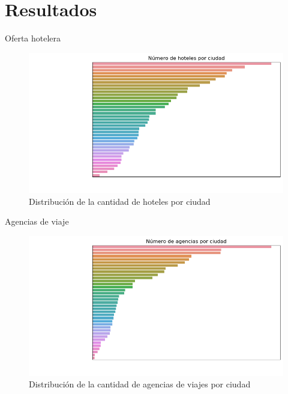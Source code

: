 \section{Resultados}

\begin{frame}{Oferta hotelera}
\begin{figure}
    \centering
    \includegraphics[scale=0.5]{figure/hoteles.png}
    \caption{Distribución de la cantidad de hoteles por ciudad}
    \label{fig:hoteles}
\end{figure}
\end{frame}

\begin{frame}{Agencias de viaje}
\begin{figure}
    \centering
    \includegraphics[scale=0.5]{figure/agencias.png}
    \caption{Distribución de la cantidad de agencias de viajes por ciudad}
    \label{fig:agencias}
\end{figure}
\end{frame}

